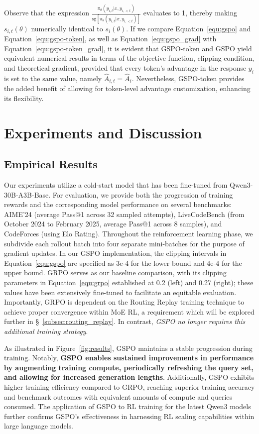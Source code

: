 Observe that the expression $\frac{ \pi_{\theta} (y_{i,t} | x, y_{i,<t}) }{ \mathrm{sg} \left[ \pi_{\theta} (y_{i,t} | x, y_{i,<t}) \right] }$ evaluates to 1, thereby making $s_{i,t}(\theta)$ numerically identical to $s_{i}(\theta)$. If we compare Equation~\eqref{equ:gspo} and Equation~\eqref{equ:gspo-token}, as well as Equation~\eqref{equ:gspo_grad} with Equation~\eqref{equ:gspo-token_grad}, it is evident that GSPO-token and GSPO yield equivalent numerical results in terms of the objective function, clipping condition, and theoretical gradient, provided that every token's advantage in the response $y_i$ is set to the same value, namely $\widehat{A}_{i,t} = \widehat{A}_{i}$. Nevertheless, GSPO-token provides the added benefit of allowing for token-level advantage customization, enhancing its flexibility.

\section{Experiments and Discussion}

\subsection{Empirical Results}

Our experiments utilize a cold-start model that has been fine-tuned from Qwen3-30B-A3B-Base. For evaluation, we provide both the progression of training rewards and the corresponding model performance on several benchmarks: AIME'24 (average Pass@1 across 32 sampled attempts), LiveCodeBench (from October 2024 to February 2025, average Pass@1 across 8 samples), and CodeForces (using Elo Rating). Throughout the reinforcement learning phase, we subdivide each rollout batch into four separate mini-batches for the purpose of gradient updates. In our GSPO implementation, the clipping intervals in Equation~\eqref{equ:gspo} are specified as 3e-4 for the lower bound and 4e-4 for the upper bound. GRPO serves as our baseline comparison, with its clipping parameters in Equation~\eqref{equ:grpo} established at 0.2 (left) and 0.27 (right); these values have been extensively fine-tuned to facilitate an equitable evaluation. Importantly, GRPO is dependent on the Routing Replay training technique to achieve proper convergence within MoE RL, a requirement which will be explored further in \S~\ref{subsec:routing_replay}. In contrast, \textit{GSPO no longer requires this additional training strategy}.

As illustrated in Figure~\ref{fig:results}, GSPO maintains a stable progression during training. Notably, \textbf{GSPO enables sustained improvements in performance by augmenting training compute, periodically refreshing the query set, and allowing for increased generation lengths}. Additionally, GSPO exhibits higher training efficiency compared to GRPO, reaching superior training accuracy and benchmark outcomes with equivalent amounts of compute and queries consumed. The application of GSPO to RL training for the latest Qwen3 models further confirms GSPO’s effectiveness in harnessing RL scaling capabilities within large language models.

